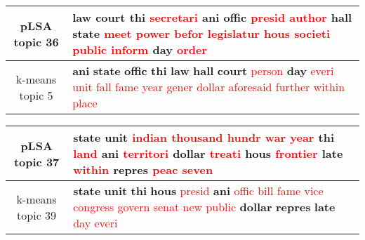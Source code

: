 \begin{center}\begin{tabularx}{\textwidth} {
  | c | >{\raggedright\arraybackslash}X | } \hline 
pLSA topic 36 & \textbf{law} \textbf{court} \textbf{thi} \textcolor{red}{secretari} \textbf{ani} \textbf{offic} \textcolor{red}{presid} \textcolor{red}{author} \textbf{hall} \textbf{state} \textcolor{red}{meet} \textcolor{red}{power} \textcolor{red}{befor} \textcolor{red}{legislatur} \textcolor{red}{hous} \textcolor{red}{societi} \textcolor{red}{public} \textcolor{red}{inform} \textbf{day} \textcolor{red}{order} \\ \hline 
k-means topic 5 & \textbf{ani} \textbf{state} \textbf{offic} \textbf{thi} \textbf{law} \textbf{hall} \textbf{court} \textcolor{red}{person} \textbf{day} \textcolor{red}{everi} \textcolor{red}{unit} \textcolor{red}{fall} \textcolor{red}{fame} \textcolor{red}{year} \textcolor{red}{gener} \textcolor{red}{dollar} \textcolor{red}{aforesaid} \textcolor{red}{further} \textcolor{red}{within} \textcolor{red}{place} \\ \hline 
\end{tabularx}

\end{center}

\begin{center}\begin{tabularx}{\textwidth} {
  | c | >{\raggedright\arraybackslash}X | } \hline 
pLSA topic 37 & \textbf{state} \textbf{unit} \textcolor{red}{indian} \textcolor{red}{thousand} \textcolor{red}{hundr} \textcolor{red}{war} \textcolor{red}{year} \textbf{thi} \textcolor{red}{land} \textbf{ani} \textcolor{red}{territori} \textbf{dollar} \textcolor{red}{treati} \textbf{hous} \textcolor{red}{frontier} \textbf{late} \textcolor{red}{within} \textbf{repres} \textcolor{red}{peac} \textcolor{red}{seven} \\ \hline 
k-means topic 39 & \textbf{state} \textbf{unit} \textbf{thi} \textbf{hous} \textcolor{red}{presid} \textbf{ani} \textcolor{red}{offic} \textcolor{red}{bill} \textcolor{red}{fame} \textcolor{red}{vice} \textcolor{red}{congress} \textcolor{red}{govern} \textcolor{red}{senat} \textcolor{red}{new} \textcolor{red}{public} \textbf{dollar} \textbf{repres} \textbf{late} \textcolor{red}{day} \textcolor{red}{everi} \\ \hline 
\end{tabularx}

\end{center}

